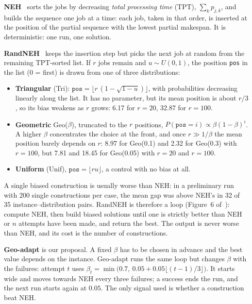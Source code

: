 \documentclass[10pt,a4paper]{article}
\begin{document}
\textbf{NEH}~\cite{neh1983} sorts the jobs by decreasing \emph{total processing time} (TPT),
$\sum_k p_{j,k}$, and builds the sequence one job at a time: each job, taken in that order, is inserted
at the position of the partial sequence with the lowest partial makespan. It is deterministic: one run,
one solution.

\textbf{RandNEH}~\cite{juan2014} keeps the insertion step but picks the next job at random from the
remaining TPT-sorted list. If $r$ jobs remain and $u\sim U(0,1)$, the position \texttt{pos} in the list
(0 = first) is drawn from one of three distributions:
\begin{itemize}
\item \textbf{Triangular} (Tri): $\texttt{pos}=\lfloor r\,(1-\sqrt{1-u})\rfloor$,
with probabilities decreasing linearly along the list. It has no parameter, but its mean position is
about $r/3$, so its bias weakens as $r$ grows: 6.17 for $r=20$, 32.87 for $r=100$.
\item \textbf{Geometric} Geo($\beta$), truncated to the $r$ positions, $P(\texttt{pos}=i)\propto
\beta(1-\beta)^i$. A higher $\beta$ concentrates the choice at the front, and once $r\gg1/\beta$ the mean
position barely depends on $r$: 8.97 for Geo(0.1) and 2.32 for Geo(0.3) with $r=100$, but 7.81 and
18.45 for Geo(0.05) with $r=20$ and $r=100$.
\item \textbf{Uniform} (Unif), $\texttt{pos}=\lfloor ru\rfloor$, a control with no bias at all.
\end{itemize}
A single biased construction is usually worse than NEH: in a preliminary run with 200 single
constructions per case, the mean gap was above NEH's in 32 of 35 instance--distribution pairs. RandNEH
is therefore a loop (Figure~6 of~\cite{juan2014}):
compute NEH, then build biased solutions until one is strictly better than NEH or $n$ attempts have
been made, and return the best. The output is never worse than NEH, and its cost is the number of
constructions.

\textbf{Geo-adapt} is our proposal. A fixed $\beta$ has to be chosen in advance and the best value
depends on the instance. Geo-adapt runs the same loop but changes $\beta$ with the failures: attempt
$t$ uses $\beta_t=\min\bigl(0.7,\ 0.05+0.05\lfloor(t-1)/3\rfloor\bigr)$. It starts wide and moves towards NEH every three failures; a success ends the run, and the
next run starts again at $0.05$. The only signal used is whether a construction beat NEH.
\end{document}

